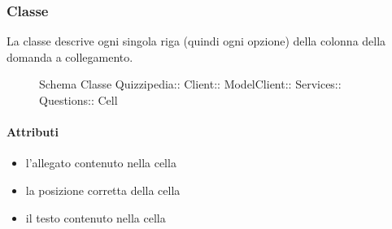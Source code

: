 \subsubsection{Classe }
La classe descrive ogni singola riga (quindi ogni opzione) della colonna della domanda a collegamento.
\begin{figure}[H]
\centering
\noindent{}
\caption[Schema Classe Cell]{Schema Classe Quizzipedia:: Client:: ModelClient:: Services:: Questions:: Cell}
\end{figure}
\paragraph{Attributi}
\begin{itemize}
\item {}
\newline
l'allegato contenuto nella cella
\item {}
\newline
la posizione corretta della cella
\item {}
\newline
il testo contenuto nella cella
\end{itemize}
